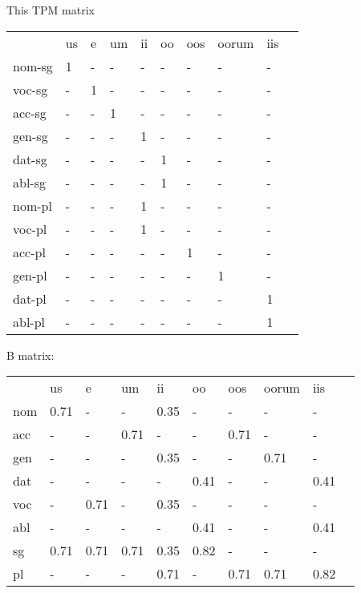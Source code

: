 \documentclass{article}
\begin{document}
 This TPM matrix  

\begin{tabular}{llllllllll}\toprule
                &us      &e       &um      &ii      &oo      &oos     &oorum   &iis     \\ 
nom-sg     &     1  &    -   &    -   &    -   &    -   &    -   &    -   &    -   \\ 
voc-sg     &    -   &     1  &    -   &    -   &    -   &    -   &    -   &    -   \\ 
acc-sg     &    -   &    -   &     1  &    -   &    -   &    -   &    -   &    -   \\ 
gen-sg     &    -   &    -   &    -   &     1  &    -   &    -   &    -   &    -   \\ 
dat-sg     &    -   &    -   &    -   &    -   &     1  &    -   &    -   &    -   \\ 
abl-sg     &    -   &    -   &    -   &    -   &     1  &    -   &    -   &    -   \\ 
nom-pl     &    -   &    -   &    -   &     1  &    -   &    -   &    -   &    -   \\ 
voc-pl     &    -   &    -   &    -   &     1  &    -   &    -   &    -   &    -   \\ 
acc-pl     &    -   &    -   &    -   &    -   &    -   &     1  &    -   &    -   \\ 
gen-pl     &    -   &    -   &    -   &    -   &    -   &    -   &     1  &    -   \\ 
dat-pl     &    -   &    -   &    -   &    -   &    -   &    -   &    -   &     1  \\ 
abl-pl     &    -   &    -   &    -   &    -   &    -   &    -   &    -   &     1  \\ 
\end{tabular}


B matrix:

\begin{tabular}{llllllllll}\toprule
                  &us      &e       &um      &ii      &oo      &oos     &oorum   &iis     \\ 
nom            &  0.71  &    -   &    -   &  0.35  &    -   &    -   &    -   &    -   \\ 
acc            &    -   &    -   &  0.71  &    -   &    -   &  0.71  &    -   &    -   \\ 
gen            &    -   &    -   &    -   &  0.35  &    -   &    -   &  0.71  &    -   \\ 
dat            &    -   &    -   &    -   &    -   &  0.41  &    -   &    -   &  0.41  \\ 
voc            &    -   &  0.71  &    -   &  0.35  &    -   &    -   &    -   &    -   \\ 
abl            &    -   &    -   &    -   &    -   &  0.41  &    -   &    -   &  0.41  \\ 
sg             &  0.71  &  0.71  &  0.71  &  0.35  &  0.82  &    -   &    -   &    -   \\ 
pl             &    -   &    -   &    -   &  0.71  &    -   &  0.71  &  0.71  &  0.82  \\ 
\end{tabular}
\end{document}
